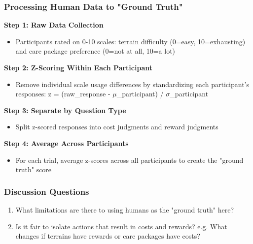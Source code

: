 \documentclass{beamer}
\begin{document}
\begin{frame}
\frametitle{Processing Human Data to "Ground Truth"}
\textbf{Step 1: Raw Data Collection}
\begin{itemize}
    \item Participants rated on 0-10 scales: terrain difficulty (0=easy, 10=exhausting) and care package preference (0=not at all, 10=a lot)
\end{itemize}

\vspace{0.2cm}
\textbf{Step 2: Z-Scoring Within Each Participant}
\begin{itemize}
    \item Remove individual scale usage differences by standardizing each participant's responses: z = (raw\_response - $\mu$\_participant) / $\sigma$\_participant
\end{itemize}

\vspace{0.2cm}
\textbf{Step 3: Separate by Question Type}
\begin{itemize}
    \item Split z-scored responses into cost judgments and reward judgments
\end{itemize}

\vspace{0.2cm}
\textbf{Step 4: Average Across Participants}
\begin{itemize}
    \item For each trial, average z-scores across all participants to create the "ground truth" score
\end{itemize}
\end{frame}

\begin{frame}
\frametitle{Discussion Questions}
\begin{enumerate}
    \item What limitations are there to using humans as the "ground truth" here?
    \item Is it fair to isolate actions that result in costs and rewards? e.g. What changes if terrains have rewards or care packages have costs?
\end{enumerate}
\end{frame}
\end{document}
